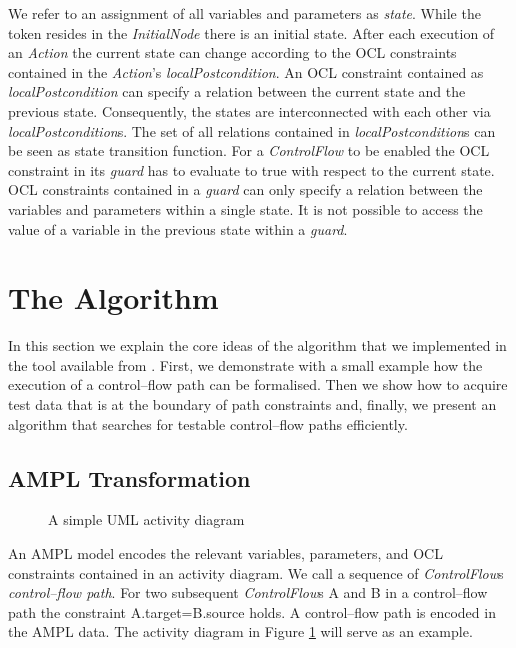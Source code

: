 \documentclass[runningheads,a4paper]{llncs}%
\newcommand{\UMLType}[1]{\textsf{\textit{#1}}} %
\newcommand{\UMLReference}[1]{\textsf{\textit{#1}}} %
\begin{document}
We refer to an assignment of all variables and parameters as \emph{state}. While the token resides in the \UMLType{InitialNode} there is an initial state. After each execution of an \UMLType{Action} the current state can change according to the OCL constraints contained in the \UMLType{Action}'s \UMLReference{localPostcondition}. An OCL constraint contained as \UMLType{localPostcondition} can specify a relation between the current state and the previous state. Consequently, the states are interconnected with each other via \UMLReference{localPostcondition}s. The set of all relations contained in \UMLType{localPostcondition}s can be seen as state transition function. For a \UMLType{ControlFlow} to be enabled the OCL constraint in its \UMLReference{guard} has to evaluate to true with respect to the current state. OCL constraints contained in a \UMLReference{guard} can only specify a relation between the variables and parameters within a single state. It is not possible to access the value of a variable in the previous state within a \UMLReference{guard}.%
\section{The Algorithm}%
\label{sec:Algorithm}%
In this section we explain the core ideas of the algorithm that we implemented in the tool available from \cite{PartegWebsite}. First, we demonstrate with a small example how the execution of a control--flow path can be formalised. Then we show how to acquire test data that is at the boundary of path constraints and, finally, we present an algorithm that searches for testable control--flow paths efficiently.%
\subsection{AMPL Transformation}%
\label{sec:AMPLTransformation}%
\begin{figure}%
\def\svgwidth{\textwidth}%
\graphicspath{{./pics/}}%
%
\caption{A simple UML activity diagram}%
\label{fig:AssignmentDecision}%
\end{figure}%
An AMPL model encodes the relevant variables, parameters, and OCL constraints contained in an activity diagram. We call a sequence of \UMLReference{ControlFlow}s \emph{control--flow path}. For two subsequent \UMLType{ControlFlow}s A and B in a control--flow path the constraint A.target=B.source holds. A control--flow path is encoded in the AMPL data. The activity diagram in Figure \ref{fig:AssignmentDecision} will serve as an example.
\end{document}
